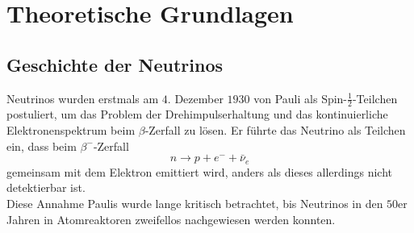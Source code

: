 \chapter{Theoretische Grundlagen}
\label{chap:theorie}

\section{Geschichte der Neutrinos}
\label{sec:neutrinogeschichte}

Neutrinos wurden erstmals am $4.$ Dezember $1930$ von Pauli als Spin-$\frac{1}{2}$-Teilchen postuliert, um das Problem der Drehimpulserhaltung und das kontinuierliche Elektronenspektrum beim $\beta$-Zerfall zu lösen. %
Er führte das Neutrino als Teilchen ein, dass beim $\beta^-$-Zerfall
\begin{equation*}
    n \rightarrow p + e^- + \bar{\nu}_e
\end{equation*}
gemeinsam mit dem Elektron emittiert wird, anders als dieses allerdings nicht detektierbar ist. \\
Diese Annahme Paulis wurde lange kritisch betrachtet, bis Neutrinos in den $50$er Jahren in Atomreaktoren zweifellos nachgewiesen werden konnten. %

